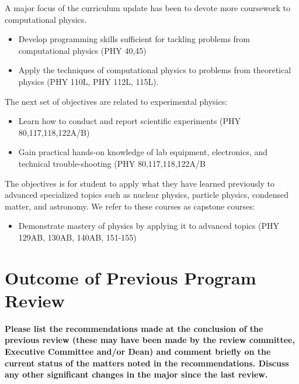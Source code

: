 \documentclass[12pt]{article}
\begin{document}
A major focus of the curriculum update has been to devote more coursework to computational physics.
\begin{itemize}
 \item Develop programming skills sufficient for tackling problems from computational physics (PHY 40,45)
 \item Apply the techniques of computational physics to problems from theoretical physics (PHY 110L, PHY 112L, 115L).
\end{itemize}
The next set of objectives are related to experimental physics:
\begin{itemize}
 \item Learn how to conduct and report scientific experiments (PHY 80,117,118,122A/B)
 \item Gain practical hands-on knowledge of lab equipment, electronics, and technical trouble-shooting (PHY 80,117,118,122A/B
\end{itemize}
The objectives is for student to apply what they have learned previously to advanced specialized topics such as nuclear physics, particle physics, condensed matter, and astronomy.  We refer to these courses as capstone courses:
\begin{itemize}
 \item Demonstrate mastery of physics by applying it to advanced topics (PHY 129AB, 130AB, 140AB, 151-155)
\end{itemize}

\section{Outcome of Previous Program Review}
\label{sec:previous}

{\bf Please list the recommendations made at the conclusion of the previous review (these may have been made by the review committee, Executive Committee and/or Dean) and comment briefly on the current status of the matters noted in the recommendations. Discuss any other significant changes in the major since the last review.}\\
\end{document}
